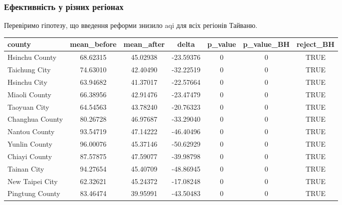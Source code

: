 \documentclass{beamer}
\begin{document}
\begin{frame}
  \frametitle{Ефективність у різних регіонах}

  Перевіримо гіпотезу, що введення реформи знизило aqi для всіх регіонів Тайваню.

  \begin{tabular}{lcccccc}
    \hline
    county & mean\_before & mean\_after & delta & p\_value & p\_value\_BH & reject\_BH \\
    \hline
    Hsinchu County    & 68.62315 & 45.02938 & -23.59376 & 0 & 0 & TRUE \\
    Taichung City     & 74.63010 & 42.40490 & -32.22519 & 0 & 0 & TRUE \\
    Hsinchu City      & 63.94682 & 41.37017 & -22.57664 & 0 & 0 & TRUE \\
    Miaoli County     & 66.38956 & 42.91476 & -23.47479 & 0 & 0 & TRUE \\
    Taoyuan City      & 64.54563 & 43.78240 & -20.76323 & 0 & 0 & TRUE \\
    Changhua County   & 80.26728 & 46.97687 & -33.29040 & 0 & 0 & TRUE \\
    Nantou County     & 93.54719 & 47.14222 & -46.40496 & 0 & 0 & TRUE \\
    Yunlin County     & 96.00076 & 45.37146 & -50.62929 & 0 & 0 & TRUE \\
    Chiayi County     & 87.57875 & 47.59077 & -39.98798 & 0 & 0 & TRUE \\
    Tainan City       & 94.27654 & 45.40709 & -48.86945 & 0 & 0 & TRUE \\
    New Taipei City   & 62.32621 & 45.24372 & -17.08248 & 0 & 0 & TRUE \\
    Pingtung County   & 83.46474 & 39.95991 & -43.50483 & 0 & 0 & TRUE \\
    \hline
  \end{tabular}
\end{frame}
\end{document}
